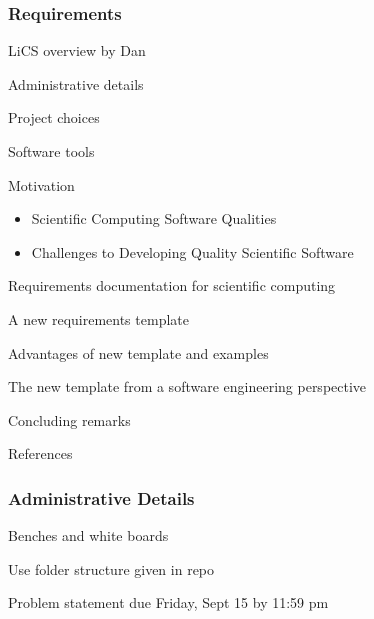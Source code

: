 \documentclass[t,12pt,numbers,fleqn]{beamer}
\begin{document}



\begin{frame}
\frametitle{Requirements}

\bi
\item LiCS overview by Dan
\item Administrative details
\item Project choices
\item Software tools
\item Motivation
\begin{itemize}
\item Scientific Computing Software Qualities
\item Challenges to Developing Quality Scientific Software
\end{itemize}
\item Requirements documentation for scientific computing
\item A new requirements template
\item Advantages of new template and examples
\item The new template from a software engineering perspective
\item Concluding remarks
\item References
\ei
\end{frame}


\begin{frame}
\frametitle{Administrative Details}

\bi
\item Benches and white boards
\item Use folder structure given in repo
\item Problem statement due Friday, Sept 15 by 11:59 pm
\ei

\end{frame}

\end{document}
